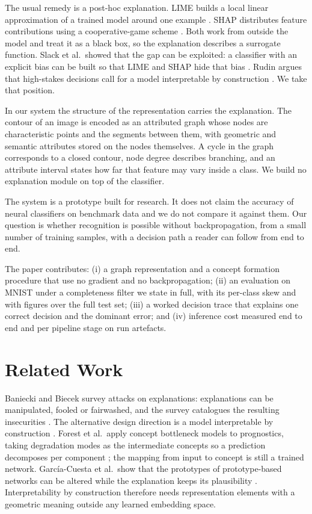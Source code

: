 The usual remedy is a post-hoc explanation. LIME builds a local linear approximation of a trained model around one example \cite{ribeiro2016}. SHAP distributes feature contributions using a cooperative-game scheme \cite{lundberg2017}. Both work from outside the model and treat it as a black box, so the explanation describes a surrogate function. Slack et al.\ showed that the gap can be exploited: a classifier with an explicit bias can be built so that LIME and SHAP hide that bias \cite{slack2020}. Rudin argues that high-stakes decisions call for a model interpretable by construction \cite{rudin2019}. We take that position.

In our system the structure of the representation carries the explanation. The contour of an image is encoded as an attributed graph whose nodes are characteristic points and the segments between them, with geometric and semantic attributes stored on the nodes themselves. A cycle in the graph corresponds to a closed contour, node degree describes branching, and an attribute interval states how far that feature may vary inside a class. We build no explanation module on top of the classifier.

The system is a prototype built for research. It does not claim the accuracy of neural classifiers on benchmark data and we do not compare it against them. Our question is whether recognition is possible without backpropagation, from a small number of training samples, with a decision path a reader can follow from end to end.

The paper contributes: (i) a graph representation and a concept formation procedure that use no gradient and no backpropagation; (ii) an evaluation on MNIST under a completeness filter we state in full, with its per-class skew and with figures over the full test set; (iii) a worked decision trace that explains one correct decision and the dominant error; and (iv) inference cost measured end to end and per pipeline stage on run artefacts.

\section{Related Work}

Baniecki and Biecek survey attacks on explanations: explanations can be manipulated, fooled or fairwashed, and the survey catalogues the resulting insecurities \cite{baniecki2024}. The alternative design direction is a model interpretable by construction \cite{rudin2019}. Forest et al.\ apply concept bottleneck models to prognostics, taking degradation modes as the intermediate concepts so a prediction decomposes per component \cite{forest2025}; the mapping from input to concept is still a trained network. Garc\'ia-Cuesta et al.\ show that the prototypes of prototype-based networks can be altered while the explanation keeps its plausibility \cite{garciacuesta2025}. Interpretability by construction therefore needs representation elements with a geometric meaning outside any learned embedding space.

